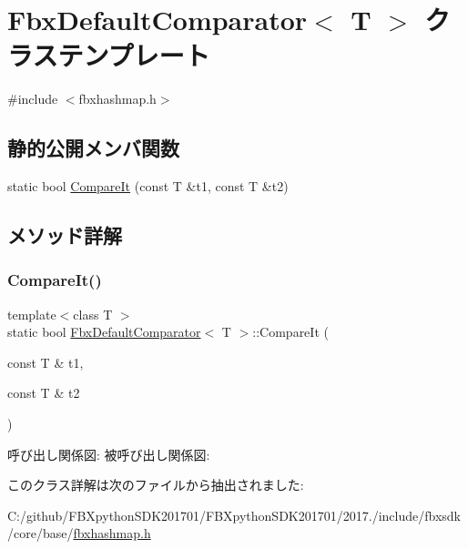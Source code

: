 \hypertarget{class_fbx_default_comparator}{}\section{Fbx\+Default\+Comparator$<$ T $>$ クラステンプレート}
\label{class_fbx_default_comparator}


{\ttfamily \#include $<$fbxhashmap.\+h$>$}

\subsection*{静的公開メンバ関数}
\begin{DoxyCompactItemize}
\item 
static bool \hyperlink{class_fbx_default_comparator_a8f36d1cd3e8a9a39ca997f18ac44f929}{Compare\+It} (const T \&t1, const T \&t2)
\end{DoxyCompactItemize}


\subsection{メソッド詳解}
\mbox{\label{class_fbx_default_comparator_a8f36d1cd3e8a9a39ca997f18ac44f929}} 
\subsubsection{\texorpdfstring{Compare\+It()}{CompareIt()}}
{\footnotesize\ttfamily template$<$class T $>$ \\
static bool \hyperlink{class_fbx_default_comparator}{Fbx\+Default\+Comparator}$<$ T $>$\+::Compare\+It (\begin{DoxyParamCaption}\item[{const T \&}]{t1,  }\item[{const T \&}]{t2 }\end{DoxyParamCaption})\hspace{0.3cm}{\ttfamily [static]}}

呼び出し関係図\+:
被呼び出し関係図\+:


このクラス詳解は次のファイルから抽出されました\+:\begin{DoxyCompactItemize}
\item 
C\+:/github/\+F\+B\+Xpython\+S\+D\+K201701/\+F\+B\+Xpython\+S\+D\+K201701/2017./include/fbxsdk/core/base/\hyperlink{fbxhashmap_8h}{fbxhashmap.\+h}\end{DoxyCompactItemize}
